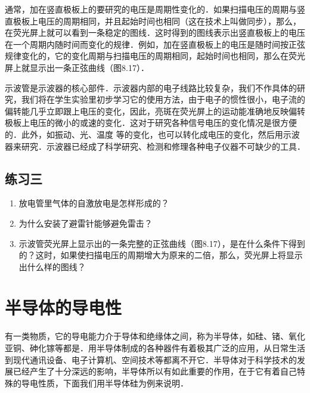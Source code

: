 通常，加在竖直极板上的要研究的电压是周期性变化的．如果扫描电压的周期与竖直极板上电压的周期相同，并且起始时间也相同（这在技术上叫做同步），那么，在荧光屏上就可以看到一条稳定的图线．这时得到的图线表示出竖直极板上的电压在一个周期内随时间而变化的规律．例如，加在竖直极板上的电压是随时间按正弦规律变化的，它的变化周期与扫描电压的周期相同，起始时间也相同，那么在荧光屏上就显示出一条正弦曲线（图8.17）．
\begin{figure}[htp]\centering

    \caption{}
\end{figure}

示波管是示波器的核心部件．示波器内部的电子线路比较复杂，我们不作具体的研究，我们将在学生实验里初步学习它的使用方法，由于电子的惯性很小，电子流的偏转能几乎立即跟上电压的变化，因此，亮斑在荧光屏上的运动能准确地反映偏转极板上电压的微小的或速的变化．这对于研究各种信号电压的变化情况是很方便的．此外，如振动、光、温度
等的变化，也可以转化成电压的变化，然后用示波器来研究．示波器已经成了科学研究、检测和修理各种电子仪器不可缺少的工具．


\subsection*{练习三}
\begin{enumerate}
    \item 放电管里气体的自激放电是怎样形成的？
    \item 为什么安装了避雷针能够避免雷击？
    \item 示波管荧光屏上显示出的一条完整的正弦曲线（图8.17），是在什么条件下得到的？这时，如果使扫描电压的周期增大为原来的二倍，那么，荧光屏上将显示出什么样的图线？
\end{enumerate}


\section{半导体的导电性}
有一类物质，它的导电能力介于导体和绝缘体之间，称为半导体，如硅、锗、氧化亚铜、砷化镓等都是．用半导体制成的各种器件有着极其广泛的应用，从日常生活到现代通讯设备、电子计算机、空间技术等都离不开它．半导体对于科学技术的发展已经产生了十分深远的影响，半导体所以有如此重要的作用，在于它有着自己特殊的导电性质，下面我们用半导体硅为例来说明．

